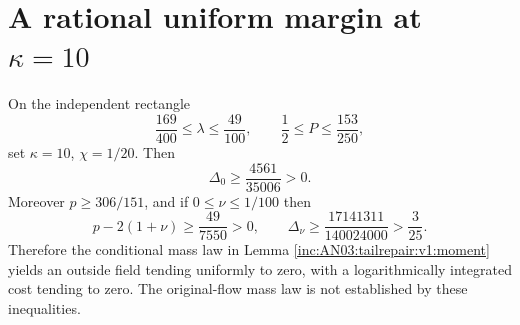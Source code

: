 \documentclass[11pt]{article}
\theoremstyle{remark}\newtheorem{remark}[theorem]{Remark}
\begin{document}
\section{A rational uniform margin at $\kappa=10$}
\begin{proposition}
\label{inc:AN03:tailrepair:v1:rational}
On the independent rectangle
\[
 \frac{169}{400}\le\lambda\le\frac{49}{100},\qquad
 \frac12\le P\le\frac{153}{250},
\]
set $\kappa=10$, $\chi=1/20$. Then
\begin{equation}\label{inc:AN03:tailrepair:v1:margin0}
 \Delta_0\ge\frac{4561}{35006}>0.
\end{equation}
Moreover $p\ge306/151$, and if $0\le\nu\le1/100$ then
\begin{equation}\label{inc:AN03:tailrepair:v1:marginnu}
 p-2(1+\nu)\ge\frac{49}{7550}>0,\qquad
 \Delta_\nu\ge\frac{17141311}{140024000}>\frac{3}{25}.
\end{equation}
Therefore the conditional mass law in Lemma \ref{inc:AN03:tailrepair:v1:moment} yields an outside field tending uniformly to zero, with a logarithmically integrated cost tending to zero. The original-flow mass law is not established by these inequalities.
\end{proposition}
\end{document}
